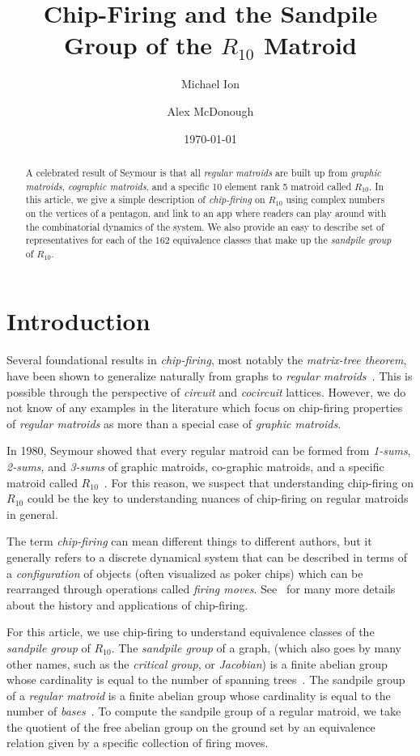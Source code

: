 \documentclass[12p]{amsart}
\author{Michael Ion}
\title{Chip-Firing and the Sandpile Group of the $R_{10}$ Matroid}
\author{Alex McDonough}
\date{\today}
\numberwithin{equation}{section}
\theoremstyle{plain}
\theoremstyle{definition}
\begin{document}
\begin{abstract}A celebrated result of Seymour is that all \emph{regular matroids} are built up from \emph{graphic matroids}, \emph{cographic matroids}, and a specific 10 element rank 5 matroid called $R_{10}$. In this article, we give a simple description of \emph{chip-firing} on $R_{10}$ using complex numbers on the vertices of a pentagon, and link to an app where readers can play around with the combinatorial dynamics of the system. We also provide an easy to describe set of representatives for each of the 162 equivalence classes that make up the \emph{sandpile group} of $R_{10}$. \end{abstract}

\maketitle

\section{Introduction}

Several foundational results in \emph{chip-firing}, most notably the \emph{matrix-tree theorem}, have been shown to generalize naturally from graphs to \emph{regular matroids}~\cite{Merino}. This is possible through the perspective of \emph{circuit} and \emph{cocircuit} lattices. However, we do not know of any examples in the literature which focus on chip-firing properties of \emph{regular matroids} as more than a special case of \emph{graphic matroids}. 

In 1980, Seymour showed that every regular matroid can be formed from \emph{1-sums}, \emph{2-sums}, and \emph{3-sums} of graphic matroids, co-graphic matroids, and a specific matroid called $R_{10}$~\cite{Seymour}. For this reason, we suspect that understanding chip-firing on $R_{10}$ could be the key to understanding nuances of chip-firing on regular matroids in general. 

The term \emph{chip-firing} can mean different things to different authors, but it generally refers to a discrete dynamical system that can be described in terms of a \emph{configuration} of objects (often visualized as poker chips) which can be rearranged through operations called \emph{firing moves}. See~\cite{Klivans} for many more details about the history and applications of chip-firing.

For this article, we use chip-firing to understand equivalence classes of the \emph{sandpile group} of $R_{10}$. The \emph{sandpile group} of a graph, (which also goes by many other names, such as the \emph{critical group}, or \emph{Jacobian}) is a finite abelian group whose cardinality is equal to the number of spanning trees~\cite{Biggs99}. The sandpile group of a \emph{regular matroid} is a finite abelian group whose cardinality is equal to the number of \emph{bases}~\cite{Merino}. To compute the sandpile group of a regular matroid, we take the quotient of the free abelian group on the ground set by an equivalence relation given by a specific collection of firing moves. 
\end{document}
